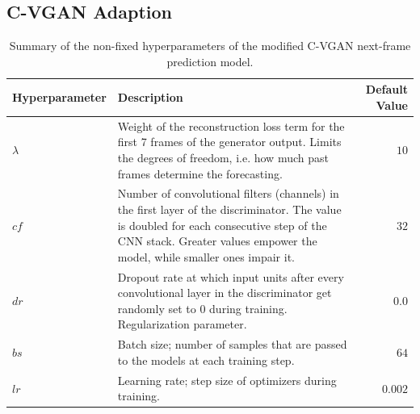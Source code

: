 \subsection{C-VGAN Adaption} \label{subsec:framework_cvgan}

\begin{table}
	\centering
	\begin{tabular}{ | l | p{9cm} | r |}
	\toprule
	\textbf{Hyperparameter} & \textbf{Description} & \textbf{Default Value} \\
	\midrule
  $\lambda$ & Weight of the reconstruction loss term for the first 7 frames of the generator output. Limits the degrees of freedom, i.e. how much past frames determine the forecasting. & $10$ \\ \hline
  $cf$ & Number of convolutional filters (channels) in the first layer of the discriminator. The value is doubled for each consecutive step of the CNN stack. Greater values empower the model, while smaller ones impair it.  & $32$ \\ \hline
  $dr$ & Dropout rate at which input units after every convolutional layer in the discriminator get randomly set to 0 during training. Regularization parameter. & $0.0$ \\ \hline
  $bs$ & Batch size; number of samples that are passed to the models at each training step. & $64$ \\ \hline
  $lr$ & Learning rate; step size of optimizers during training. & $0.002$ \\
	\bottomrule
	\end{tabular}
	\caption[Hyperparameters of the modified C-VGAN next-frame prediction model.]{Summary of the non-fixed hyperparameters of the modified C-VGAN next-frame prediction model.}
	\label{tab:cvgan_params}
\end{table}

